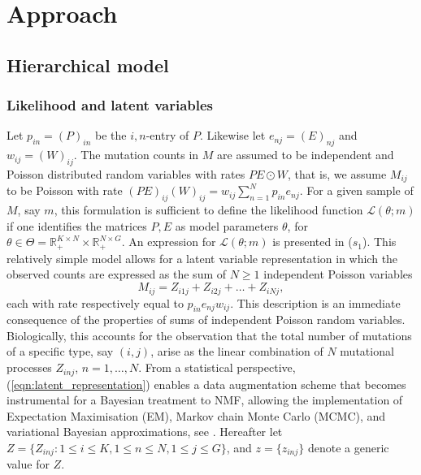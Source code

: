 \documentclass{bioinfo}
\begin{document}
\section{Approach}
\subsection{Hierarchical model}
\subsubsection{Likelihood and latent variables}
Let $p_{in} = (P)_{in}$ be the $i,n$-entry of $P$. Likewise let
$e_{nj} = (E)_{nj}$ and $w_{ij} = (W)_{ij}$.  The mutation counts in
$M$ are assumed to be independent and Poisson distributed random
variables with rates $PE\odot W$, that is, we assume $M_{ij}$ to be
Poisson with rate $(PE)_{ij}(W)_{ij} = w_{ij}\sum_{n=1}^N
p_{in}e_{nj}$. For a given sample of $M$, say $m$, this formulation is
sufficient to define the likelihood function $\mathcal L(\theta; m)$
if one identifies the matrices $P, E$ as model parameters $\theta$,
for $\theta \in \Theta = \mathbb R_+^{K\times N}\times \mathbb
R_+^{N\times G}$. An expression for $\mathcal L(\theta; m)$ is
presented in ($s_1$). This relatively simple model allows for a latent
variable representation in which the observed counts are expressed as
the sum of $N\geqslant 1$ independent Poisson variables
\begin{equation}
  \label{eqn:latent_representation}
   M_{ij} = Z_{i1j} + Z_{i2j} + \ldots + Z_{iNj},
\end{equation} 
each with rate respectively equal to $p_{in}e_{nj}w_{ij}$. This
description is an immediate consequence of the properties of sums of
independent Poisson random variables. Biologically, this accounts for
the observation that the total number of mutations of a specific type,
say $(i,j)$, arise as the linear combination of $N$ mutational processes
$Z_{inj}$, $n = 1, \ldots, N$. From a statistical perspective,
(\ref{eqn:latent_representation}) enables a data augmentation scheme
that becomes instrumental for a Bayesian treatment to NMF, allowing
the implementation of Expectation Maximisation (EM), Markov chain
Monte Carlo (MCMC), and variational Bayesian approximations, see
\cite{C}.  Hereafter let $Z = \{Z_{inj}: 1\leqslant i\leqslant K,
1\leqslant n \leqslant N, 1\leqslant j\leqslant G\}$, and $z =
\{z_{inj}\}$ denote a generic value for $Z$.
\end{document}
